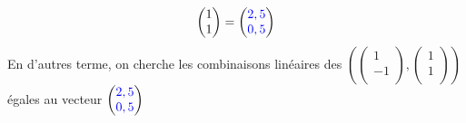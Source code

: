 \documentclass{book}
\begin{document}
\begin{Exemple}
$$\begin{pmatrix}
  1   \\
  1  \\
\end{pmatrix}=\begin{pmatrix}
 {\color{blue}2,5}   \\
 {\color{blue}0,5}  \\
\end{pmatrix}$$
En d'autres terme, on cherche les combinaisons linéaires des $(\begin{pmatrix}
 1    \\
 -1   \\
\end{pmatrix},\begin{pmatrix}
 1   \\
  1  \\
\end{pmatrix})$ égales au vecteur $\begin{pmatrix}
 {\color{blue}2,5}   \\
 {\color{blue}0,5}  \\
\end{pmatrix}$


\end{Exemple}
\end{document}
